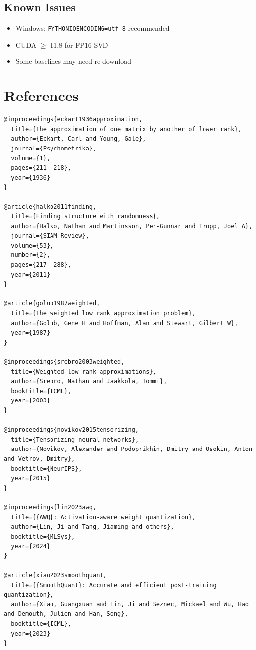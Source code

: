 \subsection{Known Issues}

\begin{itemize}
\item Windows: \texttt{PYTHONIOENCODING=utf-8} recommended
\item CUDA $\ge$ 11.8 for FP16 SVD
\item Some baselines may need re-download
\end{itemize}


\section{References}

\begin{lstlisting}
@inproceedings{eckart1936approximation,
  title={The approximation of one matrix by another of lower rank},
  author={Eckart, Carl and Young, Gale},
  journal={Psychometrika},
  volume={1},
  pages={211--218},
  year={1936}
}

@article{halko2011finding,
  title={Finding structure with randomness},
  author={Halko, Nathan and Martinsson, Per-Gunnar and Tropp, Joel A},
  journal={SIAM Review},
  volume={53},
  number={2},
  pages={217--288},
  year={2011}
}

@article{golub1987weighted,
  title={The weighted low rank approximation problem},
  author={Golub, Gene H and Hoffman, Alan and Stewart, Gilbert W},
  year={1987}
}

@inproceedings{srebro2003weighted,
  title={Weighted low-rank approximations},
  author={Srebro, Nathan and Jaakkola, Tommi},
  booktitle={ICML},
  year={2003}
}

@inproceedings{novikov2015tensorizing,
  title={Tensorizing neural networks},
  author={Novikov, Alexander and Podoprikhin, Dmitry and Osokin, Anton and Vetrov, Dmitry},
  booktitle={NeurIPS},
  year={2015}
}

@inproceedings{lin2023awq,
  title={{AWQ}: Activation-aware weight quantization},
  author={Lin, Ji and Tang, Jiaming and others},
  booktitle={MLSys},
  year={2024}
}

@article{xiao2023smoothquant,
  title={{SmoothQuant}: Accurate and efficient post-training quantization},
  author={Xiao, Guangxuan and Lin, Ji and Seznec, Mickael and Wu, Hao and Demouth, Julien and Han, Song},
  booktitle={ICML},
  year={2023}
}


\end{lstlisting}
